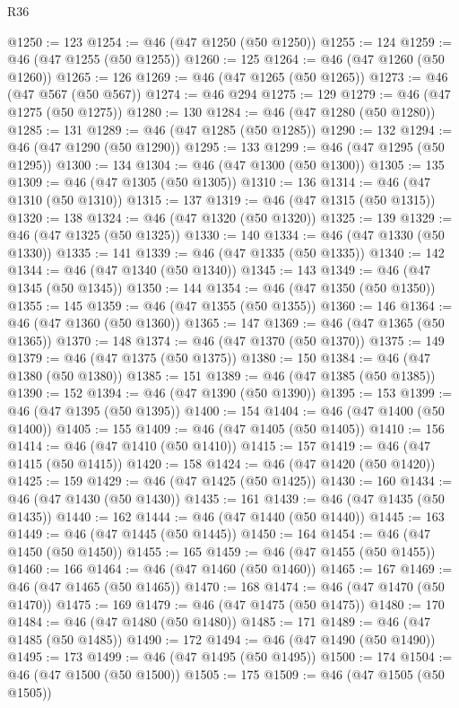 \begin{lexlean}{R36}
\begin{coremodule}
@1250 := 123
@1254 := @46 (@47 @1250 (@50 @1250))
@1255 := 124
@1259 := @46 (@47 @1255 (@50 @1255))
@1260 := 125
@1264 := @46 (@47 @1260 (@50 @1260))
@1265 := 126
@1269 := @46 (@47 @1265 (@50 @1265))
@1273 := @46 (@47 @567 (@50 @567))
@1274 := @46 @294
@1275 := 129
@1279 := @46 (@47 @1275 (@50 @1275))
@1280 := 130
@1284 := @46 (@47 @1280 (@50 @1280))
@1285 := 131
@1289 := @46 (@47 @1285 (@50 @1285))
@1290 := 132
@1294 := @46 (@47 @1290 (@50 @1290))
@1295 := 133
@1299 := @46 (@47 @1295 (@50 @1295))
@1300 := 134
@1304 := @46 (@47 @1300 (@50 @1300))
@1305 := 135
@1309 := @46 (@47 @1305 (@50 @1305))
@1310 := 136
@1314 := @46 (@47 @1310 (@50 @1310))
@1315 := 137
@1319 := @46 (@47 @1315 (@50 @1315))
@1320 := 138
@1324 := @46 (@47 @1320 (@50 @1320))
@1325 := 139
@1329 := @46 (@47 @1325 (@50 @1325))
@1330 := 140
@1334 := @46 (@47 @1330 (@50 @1330))
@1335 := 141
@1339 := @46 (@47 @1335 (@50 @1335))
@1340 := 142
@1344 := @46 (@47 @1340 (@50 @1340))
@1345 := 143
@1349 := @46 (@47 @1345 (@50 @1345))
@1350 := 144
@1354 := @46 (@47 @1350 (@50 @1350))
@1355 := 145
@1359 := @46 (@47 @1355 (@50 @1355))
@1360 := 146
@1364 := @46 (@47 @1360 (@50 @1360))
@1365 := 147
@1369 := @46 (@47 @1365 (@50 @1365))
@1370 := 148
@1374 := @46 (@47 @1370 (@50 @1370))
@1375 := 149
@1379 := @46 (@47 @1375 (@50 @1375))
@1380 := 150
@1384 := @46 (@47 @1380 (@50 @1380))
@1385 := 151
@1389 := @46 (@47 @1385 (@50 @1385))
@1390 := 152
@1394 := @46 (@47 @1390 (@50 @1390))
@1395 := 153
@1399 := @46 (@47 @1395 (@50 @1395))
@1400 := 154
@1404 := @46 (@47 @1400 (@50 @1400))
@1405 := 155
@1409 := @46 (@47 @1405 (@50 @1405))
@1410 := 156
@1414 := @46 (@47 @1410 (@50 @1410))
@1415 := 157
@1419 := @46 (@47 @1415 (@50 @1415))
@1420 := 158
@1424 := @46 (@47 @1420 (@50 @1420))
@1425 := 159
@1429 := @46 (@47 @1425 (@50 @1425))
@1430 := 160
@1434 := @46 (@47 @1430 (@50 @1430))
@1435 := 161
@1439 := @46 (@47 @1435 (@50 @1435))
@1440 := 162
@1444 := @46 (@47 @1440 (@50 @1440))
@1445 := 163
@1449 := @46 (@47 @1445 (@50 @1445))
@1450 := 164
@1454 := @46 (@47 @1450 (@50 @1450))
@1455 := 165
@1459 := @46 (@47 @1455 (@50 @1455))
@1460 := 166
@1464 := @46 (@47 @1460 (@50 @1460))
@1465 := 167
@1469 := @46 (@47 @1465 (@50 @1465))
@1470 := 168
@1474 := @46 (@47 @1470 (@50 @1470))
@1475 := 169
@1479 := @46 (@47 @1475 (@50 @1475))
@1480 := 170
@1484 := @46 (@47 @1480 (@50 @1480))
@1485 := 171
@1489 := @46 (@47 @1485 (@50 @1485))
@1490 := 172
@1494 := @46 (@47 @1490 (@50 @1490))
@1495 := 173
@1499 := @46 (@47 @1495 (@50 @1495))
@1500 := 174
@1504 := @46 (@47 @1500 (@50 @1500))
@1505 := 175
@1509 := @46 (@47 @1505 (@50 @1505))

\end{coremodule}
\end{lexlean}
